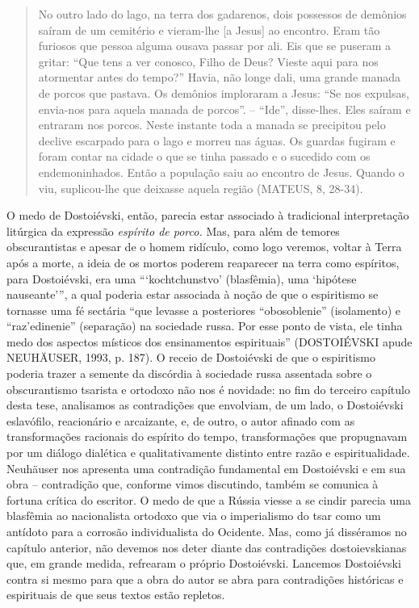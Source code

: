\begin{quote}
No outro lado do lago, na terra dos gadarenos, dois possessos de
demônios saíram de um cemitério e vieram-lhe {[}a Jesus{]} ao encontro.
Eram tão furiosos que pessoa alguma ousava passar por ali. Eis que se
puseram a gritar: ``Que tens a ver conosco, Filho de Deus? Vieste aqui
para nos atormentar antes do tempo?'' Havia, não longe dali, uma grande
manada de porcos que pastava. Os demônios imploraram a Jesus: ``Se nos
expulsas, envia-nos para aquela manada de porcos''. -- ``Ide'',
disse-lhes. Eles saíram e entraram nos porcos. Neste instante toda a
manada se precipitou pelo declive escarpado para o lago e morreu nas
águas. Os guardas fugiram e foram contar na cidade o que se tinha
passado e o sucedido com os endemoninhados. Então a população saiu ao
encontro de Jesus. Quando o viu, suplicou-lhe que deixasse aquela região
(MATEUS, 8, 28-34).
\end{quote}

O medo de Dostoiévski, então, parecia estar associado à tradicional
interpretação litúrgica da expressão \emph{espírito de porco.} Mas, para
além de temores obscurantistas e apesar de o homem ridículo, como logo
veremos, voltar à Terra após a morte, a ideia de os mortos poderem
reaparecer na terra como espíritos, para Dostoiévski, era uma
```kochtchunstvo' (blasfêmia), uma `hipótese nauseante''', a qual
poderia estar associada à noção de que o espiritismo se tornasse uma fé
sectária ``que levasse a posteriores ``obosoblenie'' (isolamento) e
``raz'edinenie'' (separação) na sociedade russa. Por esse ponto de
vista, ele tinha medo dos aspectos místicos dos ensinamentos
espirituais'' (DOSTOIÉVSKI apude NEUHÄUSER, 1993, p. 187). O receio de
Dostoiévski de que o espiritismo poderia trazer a semente da discórdia à
sociedade russa assentada sobre o obscurantismo tsarista e ortodoxo não
nos é novidade: no fim do terceiro capítulo desta tese, analisamos as
contradições que envolviam, de um lado, o Dostoiévski eslavófilo,
reacionário e arcaizante, e, de outro, o autor afinado com as
transformações racionais do espírito do tempo, transformações que
propugnavam por um diálogo dialética e qualitativamente distinto entre
razão e espiritualidade. Neuhäuser nos apresenta uma contradição
fundamental em Dostoiévski e em sua obra -- contradição que, conforme
vimos discutindo, também se comunica à fortuna crítica do escritor. O
medo de que a Rússia viesse a se cindir parecia uma blasfêmia ao
nacionalista ortodoxo que via o imperialismo do tsar como um antídoto
para a corrosão individualista do Ocidente. Mas, como já disséramos no
capítulo anterior, não devemos nos deter diante das contradições
dostoievskianas que, em grande medida, refrearam o próprio Dostoiévski.
Lancemos Dostoiévski contra si mesmo para que a obra do autor se abra
para contradições históricas e espirituais de que seus textos estão
repletos.

